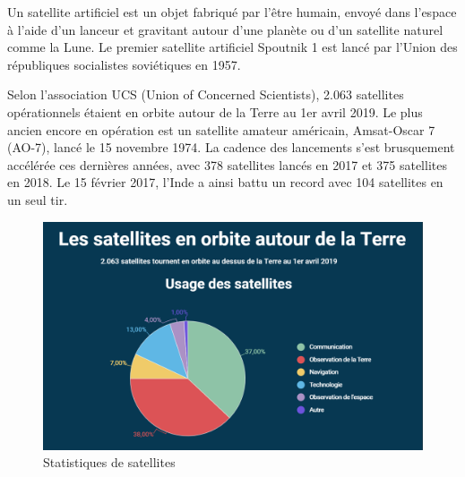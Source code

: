 \documentclass[12pt, openany]{report}
\begin{document}
Un satellite artificiel est un objet fabriqué par l'être humain, envoyé dans l'espace à l'aide d'un lanceur et gravitant autour d'une planète ou d'un satellite naturel comme la Lune.  
Le premier satellite artificiel Spoutnik 1 est lancé par l’Union des républiques socialistes soviétiques en 1957.
\par
Selon l'association UCS (Union of Concerned Scientists), 2.063 satellites opérationnels étaient en orbite autour de la Terre au 1er avril 2019. Le plus ancien encore en opération est un satellite amateur américain, Amsat-Oscar 7 (AO-7), lancé le 15 novembre 1974. La cadence des lancements s'est brusquement accélérée ces dernières années, avec 378 satellites lancés en 2017 et 375 satellites en 2018. Le 15 février 2017, l'Inde a ainsi battu un record avec 104 satellites en un seul tir.\cite{orbite}

\begin{figure}[H]
\centering
\includegraphics[scale=0.5]{satellite.png}
\caption{Statistiques de satellites}
\end{figure}
\end{document}
